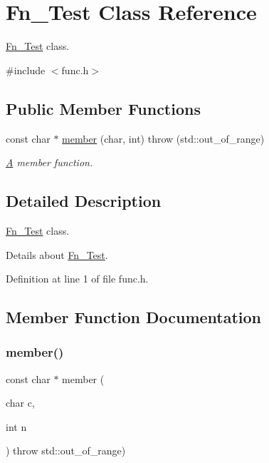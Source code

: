 \hypertarget{class_fn___test}{}\section{Fn\+\_\+\+Test Class Reference}
\label{class_fn___test}


\hyperlink{class_fn___test}{Fn\+\_\+\+Test} class.  




{\ttfamily \#include $<$func.\+h$>$}

\subsection*{Public Member Functions}
\begin{DoxyCompactItemize}
\item 
const char $\ast$ \hyperlink{class_fn___test_ac2e7badca1267f289b96035d067b4bc1}{member} (char, int)  throw (std\+::out\+\_\+of\+\_\+range)
\begin{DoxyCompactList}\small\item\em \hyperlink{class_a}{A} member function. \end{DoxyCompactList}\end{DoxyCompactItemize}


\subsection{Detailed Description}
\hyperlink{class_fn___test}{Fn\+\_\+\+Test} class. 

Details about \hyperlink{class_fn___test}{Fn\+\_\+\+Test}. 

Definition at line 1 of file func.\+h.



\subsection{Member Function Documentation}
\mbox{\label{class_fn___test_ac2e7badca1267f289b96035d067b4bc1}} 
\subsubsection{\texorpdfstring{member()}{member()}}
{\footnotesize\ttfamily const char $\ast$ member (\begin{DoxyParamCaption}\item[{char}]{c,  }\item[{int}]{n }\end{DoxyParamCaption}) throw  std\+::out\+\_\+of\+\_\+range) }



